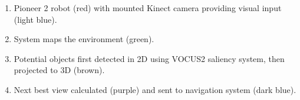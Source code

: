 
\large{
\begin{enumerate}\itemsep54pt
	\item Pioneer 2 robot (red) with mounted Kinect camera providing visual input (light blue).
	\item System maps the environment (green).
	\item Potential objects first detected in 2D using VOCUS2 saliency system\cite{garcia2013computational}, then projected to 3D (brown).
	\item Next best view calculated (purple) and sent to navigation system (dark blue).
\end{enumerate}}